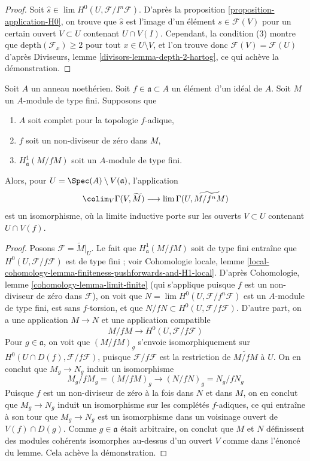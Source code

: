 \begin{proof}
Soit $\hat s \in \lim H^0(U, \mathcal{F}/I^n\mathcal{F})$.
D'après la proposition \ref{proposition-application-H0},
on trouve que $\hat s$ est l'image d'un élément $s \in \mathcal{F}(V)$
pour un certain ouvert $V \subset U$ contenant $U \cap V(I)$.
Cependant, la condition (3) montre que $\text{depth}(\mathcal{F}_x) \geq 2$
pour tout $x \in U \setminus V$, et l'on trouve donc
$\mathcal{F}(V) = \mathcal{F}(U)$ d'après
Diviseurs, lemme \ref{divisors-lemma-depth-2-hartog},
ce qui achève la démonstration.
\end{proof}

\begin{lemma}
\label{lemma-alternative-colim-H0}
Soit $A$ un anneau noethérien. Soit $f \in \mathfrak a \subset A$
un élément d'un idéal de $A$. Soit $M$ un $A$-module de type fini.
Supposons que
\begin{enumerate}
\item $A$ soit complet pour la topologie $f$-adique,
\item $f$ soit un non-diviseur de zéro dans $M$,
\item $H^1_\mathfrak a(M/fM)$ soit un $A$-module de type fini.
\end{enumerate}
Alors, pour $U = \Spec(A) \setminus V(\mathfrak a)$, l'application
$$
\colim_V \Gamma(V, \widetilde{M})
\longrightarrow
\lim \Gamma(U, \widetilde{M/f^nM})
$$
est un isomorphisme, où la limite inductive porte sur les ouverts $V \subset U$
contenant $U \cap V(f)$.
\end{lemma}

\begin{proof}
Posons $\mathcal{F} = \widetilde{M}|_U$.
Le fait que $H^1_\mathfrak a(M/fM)$ soit de type fini entraîne que
$H^0(U, \mathcal{F}/f\mathcal{F})$ est de type fini ; voir
Cohomologie locale, lemme
\ref{local-cohomology-lemma-finiteness-pushforwards-and-H1-local}.
D'après Cohomologie, lemme \ref{cohomology-lemma-limit-finite}
(qui s'applique puisque $f$ est un non-diviseur de zéro dans $\mathcal{F}$),
on voit que $N = \lim H^0(U, \mathcal{F}/f^n\mathcal{F})$
est un $A$-module de type fini, est sans $f$-torsion, et que
$N/fN \subset H^0(U, \mathcal{F}/f\mathcal{F})$.
D'autre part, on a une application $M \to N$ et une application compatible
$$
M/fM \longrightarrow H^0(U, \mathcal{F}/f\mathcal{F})
$$
Pour $g \in \mathfrak a$, on voit que $(M/fM)_g$ s'envoie isomorphiquement
sur $H^0(U \cap D(f), \mathcal{F}/f\mathcal{F})$, puisque
$\mathcal{F}/f\mathcal{F}$ est la restriction de $\widetilde{M/fM}$ à $U$.
On en conclut que $M_g \to N_g$ induit un isomorphisme
$$
M_g/fM_g = (M/fM)_g \to (N/fN)_g = N_g/fN_g
$$
Puisque $f$ est un non-diviseur de zéro à la fois dans $N$ et dans $M$, on en conclut
que $M_g \to N_g$ induit un isomorphisme sur les complétés $f$-adiques,
ce qui entraîne à son tour que $M_g \to N_g$ est un isomorphisme dans un voisinage
ouvert de $V(f) \cap D(g)$.
Comme $g \in \mathfrak a$ était arbitraire, on conclut que $M$ et $N$
définissent des modules cohérents isomorphes au-dessus d'un ouvert $V$
comme dans l'énoncé du lemme. Cela achève la démonstration.
\end{proof}


